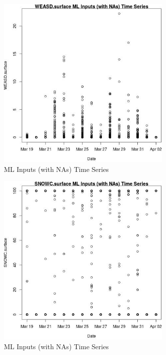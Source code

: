 \begin{figure} 
\centering  
\includegraphics[width=0.77\textwidth]{Code_Outputs/Report_ML_input_PM25_Step4_part_e_de_duplicated_aveswNAs_WEASDsurfacevDate.jpg} 
\caption{\label{fig:Report_ML_input_PM25_Step4_part_e_de_duplicated_aveswNAsWEASDsurfacevDate}ML Inputs (with NAs) Time Series} 
\end{figure} 
 

\begin{figure} 
\centering  
\includegraphics[width=0.77\textwidth]{Code_Outputs/Report_ML_input_PM25_Step4_part_e_de_duplicated_aveswNAs_SNOWCsurfacevDate.jpg} 
\caption{\label{fig:Report_ML_input_PM25_Step4_part_e_de_duplicated_aveswNAsSNOWCsurfacevDate}ML Inputs (with NAs) Time Series} 
\end{figure} 
 

